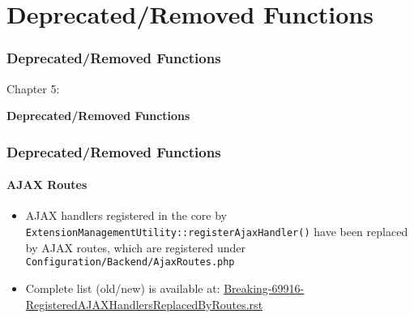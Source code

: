 %

\section{Deprecated/Removed Functions}
\begin{frame}[fragile]
	\frametitle{Deprecated/Removed Functions}

	\begin{center}\huge{Chapter 5:}\end{center}
	\begin{center}\huge{\color{typo3darkgrey}\textbf{Deprecated/Removed Functions}}\end{center}

\end{frame}


\begin{frame}[fragile]
	\frametitle{Deprecated/Removed Functions}
	\framesubtitle{AJAX Routes}

	\begin{itemize}

		\item AJAX handlers registered in the core by
			\texttt{ExtensionManagementUtility::registerAjaxHandler()}
			have been replaced by AJAX routes, which are registered under
			\texttt{ Configuration/Backend/AjaxRoutes.php}

		\item Complete list (old/new) is available at:\newline
				\href{https://forge.typo3.org/projects/typo3cms-core/repository/revisions/3f0fb6229ba391356e5ed4984eb1c9418ba6663e/entry/typo3/sysext/core/Documentation/Changelog/master/Breaking-69916-RegisteredAJAXHandlersReplacedByRoutes.rst}{Breaking-69916-RegisteredAJAXHandlersReplacedByRoutes.rst}
	\end{itemize}

\end{frame}

